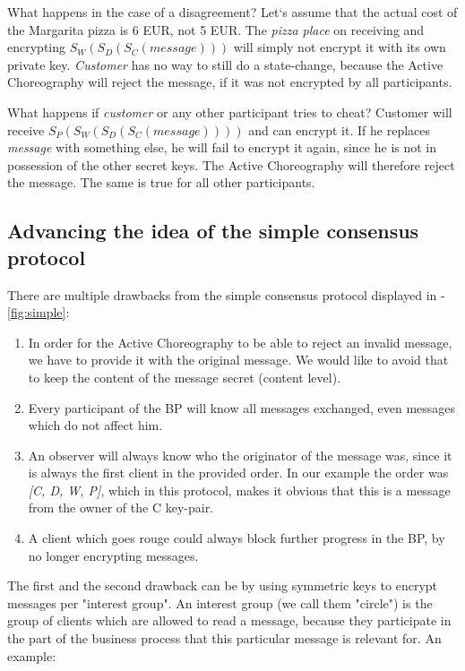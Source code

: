 \documentclass[runningheads]{llncs}
\begin{document}
What happens in the case of a disagreement? Let`s assume that the actual cost of the Margarita pizza is 6 EUR, not 5 EUR. The \textit{pizza place} on receiving and encrypting  $S_W(S_D(S_C(message)))$ will simply not encrypt it with its own private key. \textit{Customer} has no way to still do a state-change, because the Active Choreography will reject the message, if it was not encrypted by all participants. 

What happens if \textit{customer} or any other participant tries to cheat? Customer will receive $S_P(S_W(S_D(S_C(message))))$ and can encrypt it. If he replaces \textit{message} with something else, he will fail to encrypt it again, since he is not in possession of the other secret keys. The Active Choreography will therefore reject the message. The same is true for all other participants. 


\subsection{Advancing the idea of the simple consensus protocol}

There are multiple drawbacks from the simple consensus protocol displayed in -\ref{fig:simple}: 

\begin{enumerate}
    \item In order for the Active Choreography to be able to reject an invalid message, we have to provide it with the original message. We would like to avoid that to keep the content of the message secret (content level).
    \item Every participant of the BP will know all messages exchanged, even messages which do not affect him. 
    \item An observer will always know who the originator of the message was, since it is always the first client in the provided order. In our example the order was \textit{[C, D, W, P]}, which in this protocol, makes it obvious that this is a message from the owner of the C key-pair.
    \item A client which goes rouge could always block further progress in the BP, by no longer encrypting messages.
\end{enumerate}

The first and the second drawback can be by using symmetric keys to encrypt messages per "interest group". An interest group (we call them "circle") is the group of clients which are allowed to read a message, because they participate in the part of the business process that this particular message is relevant for. An example: 
\end{document}
